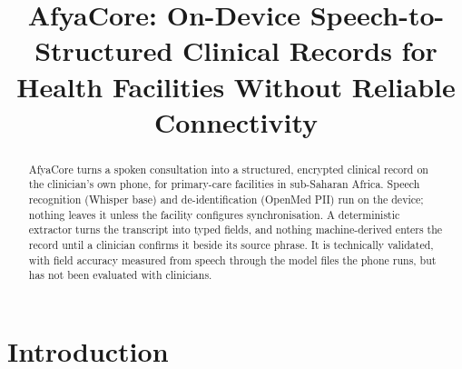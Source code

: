 %
%
%
%

\providecommand{\citep}{\cite}

\title{AfyaCore: On-Device Speech-to-Structured Clinical Records for
Health Facilities Without Reliable Connectivity}


\begin{abstract}
AfyaCore turns a spoken consultation into a structured, encrypted clinical
record on the clinician's own phone, for primary-care facilities in sub-Saharan
Africa. Speech recognition (Whisper base) and de-identification (OpenMed PII)
run on the device; nothing leaves it unless the facility configures
synchronisation. A deterministic extractor turns the transcript into typed
fields, and nothing machine-derived enters the record until a clinician
confirms it beside its source phrase. It is technically validated, with field accuracy measured from speech through
the model files the phone runs, but has not been evaluated with clinicians.
\end{abstract}

\section{Introduction}

